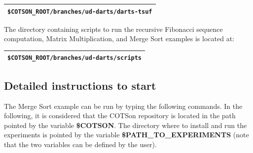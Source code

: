 \documentclass[a4paper]{article}
\begin{document}
\begin{flushleft}
\tablehead{}
\begin{supertabular}{|m{6.29346in}|}
\hline
{}
\texttt{\$COTSON\_ROOT/branches/ud-darts/darts-tsuf}\\\hline
\end{supertabular}
\end{flushleft}
{
The directory containing scripts to run the recursive Fibonacci sequence
computation, Matrix Multiplication, and Merge Sort examples is located
at: }

\begin{flushleft}
\tablehead{}
\begin{supertabular}{|m{6.29346in}|}
\hline
{}
\texttt{\$COTSON\_ROOT/branches/ud-darts/scripts}\\\hline
\end{supertabular}
\end{flushleft}
\subsection[Detailed instructions to start]{Detailed instructions to
start}
{
The Merge Sort example can be run by typing the following commands. In
the following, it is considered that the COTSon repository is located
in the path pointed by the variable \textbf{\$COTSON}. The directory
where to install and run the experiments is pointed by the variable
\textbf{\$PATH\_TO\_EXPERIMENTS }(note that the two variables can be
defined by the user).}
\end{document}
